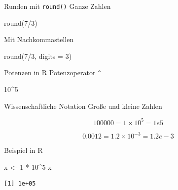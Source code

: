 \documentclass[
  10pt,
  ignorenonframetext,
  aspectratio=169,
]{beamer}
\newenvironment{Shaded}{}{}
\newcommand{\AttributeTok}[1]{\textcolor[rgb]{0.49,0.56,0.16}{#1}}
\newcommand{\DecValTok}[1]{\textcolor[rgb]{0.25,0.63,0.44}{#1}}
\newcommand{\FunctionTok}[1]{\textcolor[rgb]{0.02,0.16,0.49}{#1}}
\newcommand{\NormalTok}[1]{#1}
\newcommand{\OtherTok}[1]{\textcolor[rgb]{0.00,0.44,0.13}{#1}}
\newcommand{\SpecialCharTok}[1]{\textcolor[rgb]{0.25,0.44,0.63}{#1}}
\begin{document}
\begin{frame}[fragile]{Runden mit \texttt{round()}}
\label{runden-mit-round}
Ganze Zahlen

\begin{Shaded}
\begin{Highlighting}[]
\FunctionTok{round}\NormalTok{(}\DecValTok{7}\SpecialCharTok{/}\DecValTok{3}\NormalTok{)}
\end{Highlighting}
\end{Shaded}

Mit Nachkommastellen

\begin{Shaded}
\begin{Highlighting}[]
\FunctionTok{round}\NormalTok{(}\DecValTok{7}\SpecialCharTok{/}\DecValTok{3}\NormalTok{, }\AttributeTok{digits =} \DecValTok{3}\NormalTok{)}
\end{Highlighting}
\end{Shaded}
\end{frame}

\begin{frame}[fragile]{Potenzen in R}
\label{potenzen-in-r}
Potenzoperator \texttt{\^{}}

\begin{Shaded}
\begin{Highlighting}[]
\DecValTok{10}\SpecialCharTok{\^{}}\DecValTok{5}
\end{Highlighting}
\end{Shaded}
\end{frame}

\begin{frame}[fragile]{Wissenschaftliche Notation}
\label{wissenschaftliche-notation}
Große und kleine Zahlen

\[
100000 = 1 \times 10^5 = 1e5
\]

\[
0.0012 = 1.2 \times 10^{-3} = 1.2e-3
\]

Beispiel in R

\begin{Shaded}
\begin{Highlighting}[]
\NormalTok{x }\OtherTok{\textless{}{-}} \DecValTok{1} \SpecialCharTok{*} \DecValTok{10}\SpecialCharTok{\^{}}\DecValTok{5}
\NormalTok{x}
\end{Highlighting}
\end{Shaded}

\begin{verbatim}
[1] 1e+05
\end{verbatim}
\end{frame}
\end{document}
